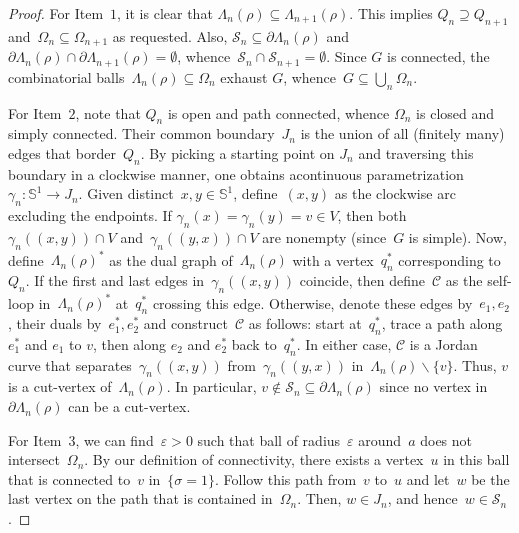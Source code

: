 \documentclass[10pt,a4paper]{amsart}
\newcommand\bbS{\mathbb S}
\newcommand\calC{\mathcal C}
\newcommand\calS{\mathcal S}
\newcommand\domain\Omega
\renewcommand\setminus\smallsetminus
\renewcommand\subset\subseteq
\begin{document}
\begin{proof}
	For Item~$1$, it is clear that $\Lambda_n(\rho) \subseteq \Lambda_{n+1}(\rho)$.
	This implies $Q_n \supseteq Q_{n+1}$ and~$\domain_{n}\subseteq \domain_{n+1}$ as requested. 
	Also, $\calS_n\subseteq \partial \Lambda_n(\rho)$ and~$\partial \Lambda_n(\rho) \cap \partial \Lambda_{n+1}(\rho) = \emptyset$, whence~$\calS_n\cap \calS_{n+1} = \emptyset$.
	Since $G$ is connected, the combinatorial balls~$\Lambda_n(\rho)\subseteq \domain_n$ exhaust $G$, whence~$G \subseteq \bigcup_n \domain_n$.
	
	For Item~$2$, note that $Q_n$ is open and path connected, whence $\domain_n$ is closed and simply connected. 
	Their common boundary~$J_n$ is the union of all (finitely many) edges that border~$Q_n$.
	By picking a starting point on $J_n$ and traversing this boundary in a clockwise manner, one obtains acontinuous parametrization $\gamma_n: \bbS^1 \to J_n$.  Given distinct~$x,y\in \bbS^1$, define~$(x,y)$ as the clockwise arc excluding the endpoints. If $\gamma_n(x)=\gamma_n(y)=v\in V$, then both~$\gamma_n((x,y))\cap V$ and~$\gamma_n((y,x))\cap V$ are nonempty (since~$G$ is simple).
	Now, define~$\Lambda_n(\rho)^*$ as the dual graph of~$\Lambda_n(\rho)$ with a vertex~$q_n^*$ corresponding to~$Q_n$.
	If the first and last edges in~$\gamma_n((x,y))$ coincide, then define~$\calC$ as the self-loop in~$\Lambda_n(\rho)^*$  at~$q_n^*$ crossing this edge.  
	Otherwise, denote these edges by~$e_1,e_2$, their duals by~$e_1^*,e_2^*$ and construct~$\calC$ as follows:  start at~$q_n^*$, trace a path along $e_1^*$ and $e_1$ to $v$, then along $e_2$ and $e_2^*$ back to~$q_n^*$.
	In either case, $\calC$ is a Jordan curve that separates~$\gamma_n((x,y))$ from~$\gamma_n((y,x))$ in~$\Lambda_n(\rho) \setminus \{v\}$.
	Thus, $v$ is a cut-vertex of~$\Lambda_n(\rho)$.
	In particular, $v\not\in \calS_n\subset \partial\Lambda_n(\rho)$ since no vertex in~$\partial\Lambda_n(\rho)$ can be a cut-vertex.
	
	For Item~$3$, we can find~$\varepsilon>0$ such that ball of radius~$\varepsilon$ around~$a$ does not intersect~$\domain_n$.
	By our definition of connectivity, there exists a vertex~$u$ in this ball that is connected to~$v$ in~$\{\sigma=1\}$.
	Follow this path from~$v$ to~$u$ and let~$w$ be the last vertex on the path that is contained in~$\domain_n$.
	Then, $w\in J_n$, and hence~$w\in \calS_n$.
\end{proof}
\end{document}
